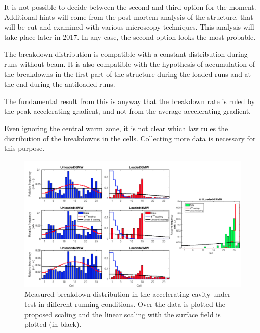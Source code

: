 It is not possible to decide between the second and third option for the moment. Additional hints will come from the post-mortem analysis of the structure, that will be cut and examined with various microscopy techniques. This analysis will take place later in 2017. In any case, the second option looks the most probable. 

The breakdown distribution is compatible with a constant distribution during runs without beam. It is also compatible with the hypothesis of accumulation of the breakdowns in  the first part of the structure during the loaded runs and at the end during the antiloaded runs.

The fundamental result from this is anyway that the breakdown rate is ruled by the peak accelerating gradient, and not from the average accelerating gradient.


Even ignoring the central warm zone, it is not clear which law rules the distribution of the breakdowns in the cells. Collecting more data is necessary for this purpose.


\begin{landscape}

\begin{figure}[h]
\centering 
\includegraphics[scale=0.53]{pictures/distro_all.png}
\caption{Measured breakdown distribution in the accelerating cavity under test in different running conditions. Over the data is plotted the proposed scaling and the linear scaling with the surface field is plotted (in black).}
\label{BD_distro}
\end{figure}
 
\end{landscape}


